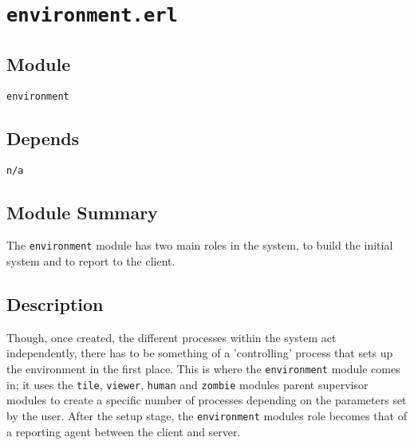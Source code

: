 \pagestyle{empty}
\section{\tt environment.erl}
\subsection{Module}
\verb+environment+
\subsection{Depends}
{\tt n/a}
\subsection{Module Summary}
The \verb+environment+ module has two main roles in the system, to build the initial system and to report to the client.
\subsection{Description}
Though, once created, the different processes within the system act independently, there has to be something of a 'controlling' process that sets up the environment in the first place. This is where the \verb+environment+ module comes in; it uses the \verb+tile+, \verb+viewer+, \verb+human+ and \verb+zombie+ modules parent supervisor modules to create a specific number of processes depending on the parameters set by the user.
After the setup stage, the \verb+environment+ modules role becomes that of a reporting agent between the client and server.
